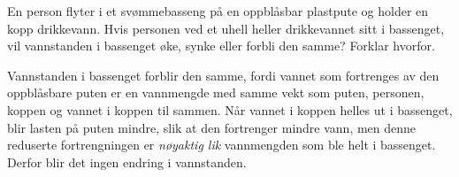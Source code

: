 

En person flyter i et svømmebasseng på en oppblåsbar plastpute og holder en kopp drikkevann. Hvis personen ved et uhell heller drikkevannet sitt i bassenget, vil vannstanden i bassenget øke, synke eller forbli den samme? Forklar hvorfor.







Vannstanden i bassenget forblir den samme, fordi vannet som fortrenges av den oppblåsbare puten er en vannmengde med samme vekt som puten, personen, koppen og vannet i koppen til sammen. Når vannet i koppen helles ut i bassenget, blir lasten på puten mindre, slik at den fortrenger mindre vann, men denne reduserte fortrengningen er {\it nøyaktig lik} vannmengden som ble helt i bassenget. Derfor blir det ingen endring i vannstanden.









